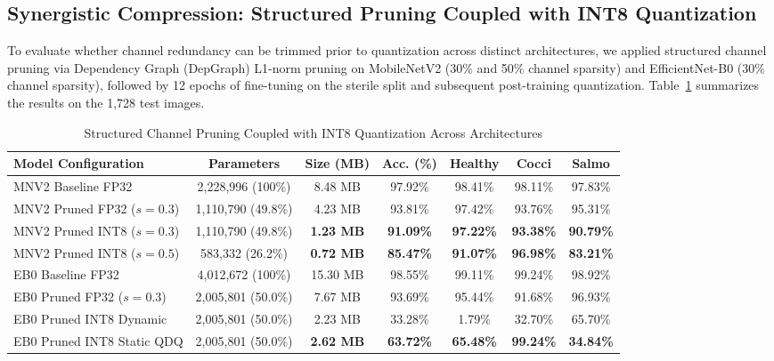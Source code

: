 \documentclass[11pt,a4paper]{article}
\begin{document}
\subsection{Synergistic Compression: Structured Pruning Coupled with INT8 Quantization}
To evaluate whether channel redundancy can be trimmed prior to quantization across distinct architectures, we applied structured channel pruning via Dependency Graph (DepGraph) L1-norm pruning on MobileNetV2 (30\% and 50\% channel sparsity) and EfficientNet-B0 (30\% channel sparsity), followed by 12 epochs of fine-tuning on the sterile split and subsequent post-training quantization. Table~\ref{tab:pruning} summarizes the results on the 1,728 test images.

\begin{table}[htbp]
\centering
\caption{Structured Channel Pruning Coupled with INT8 Quantization Across Architectures}
\label{tab:pruning}
\small
\begin{tabular}{lcccccc}
\toprule
\textbf{Model Configuration} & \textbf{Parameters} & \textbf{Size (MB)} & \textbf{Acc. (\%)} & \textbf{Healthy} & \textbf{Cocci} & \textbf{Salmo} \\
\midrule
MNV2 Baseline FP32 & 2,228,996 (100\%) & 8.48 MB & 97.92\% & 98.41\% & 98.11\% & 97.83\% \\
MNV2 Pruned FP32 ($s=0.3$) & 1,110,790 (49.8\%) & 4.23 MB & 93.81\% & 97.42\% & 93.76\% & 95.31\% \\
MNV2 Pruned INT8 ($s=0.3$) & 1,110,790 (49.8\%) & \textbf{1.23 MB} & \textbf{91.09\%} & \textbf{97.22\%} & \textbf{93.38\%} & \textbf{90.79\%} \\
MNV2 Pruned INT8 ($s=0.5$) & 583,332 (26.2\%) & \textbf{0.72 MB} & \textbf{85.47\%} & \textbf{91.07\%} & \textbf{96.98\%} & \textbf{83.21\%} \\
\midrule
EB0 Baseline FP32 & 4,012,672 (100\%) & 15.30 MB & 98.55\% & 99.11\% & 99.24\% & 98.92\% \\
EB0 Pruned FP32 ($s=0.3$) & 2,005,801 (50.0\%) & 7.67 MB & 93.69\% & 95.44\% & 91.68\% & 96.93\% \\
EB0 Pruned INT8 Dynamic & 2,005,801 (50.0\%) & 2.23 MB & 33.28\% & 1.79\% & 32.70\% & 65.70\% \\
EB0 Pruned INT8 Static QDQ & 2,005,801 (50.0\%) & \textbf{2.62 MB} & \textbf{63.72\%} & \textbf{65.48\%} & \textbf{99.24\%} & \textbf{34.84\%} \\
\bottomrule
\end{tabular}
\end{table}
\end{document}

